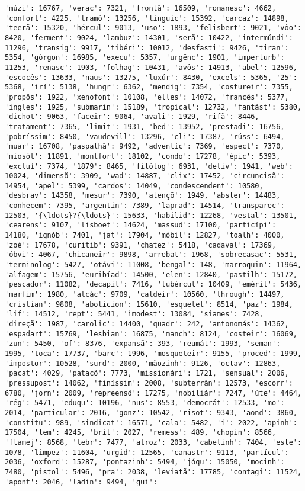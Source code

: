 \documentclass[11pt]{article}
\begin{document}
\begin{Verbatim}[commandchars=\\\{\}]
'múzi': 16767, 'verac': 7321, 'frontã': 16509, 'romanesc': 4662, 'confort': 4225, 'tramó': 13256, 'linguic': 15392, 'carcaz': 14898, 'teerã': 15320, 'hércul': 9013, 'uso': 1893, 'felisbert': 9021, 'vôo': 8420, 'ferment': 9024, 'lambuz': 14301, 'serã': 10422, 'intermúndi': 11296, 'transig': 9917, 'tibéri': 10012, 'desfasti': 9426, 'tiran': 5354, 'górgon': 16985, 'execu': 5357, 'urgênc': 1901, 'imperturb': 11253, 'renasc': 1903, 'folhag': 10431, 'avôs': 14913, 'abel': 12596, 'escocês': 13633, 'naus': 13275, 'luxúr': 8430, 'excels': 5365, '25': 5368, 'irí': 5138, 'hungr': 6362, 'mendig': 7354, 'costureir': 7355, 'propôs': 1922, 'xenofont': 10108, 'elles': 14072, 'francês': 5377, 'ingles': 1925, 'submarin': 15189, 'tropical': 12732, 'fantást': 5380, 'dichot': 9063, 'faceir': 9064, 'avali': 1929, 'rifã': 8446, 'tratament': 7365, 'limit': 1931, 'bed': 13952, 'prestadi': 16756, 'pobríssim': 8450, 'vaudevill': 13296, 'cli': 17387, 'rúss': 6494, 'muar': 16708, 'paspalhã': 9492, 'adventíc': 7369, 'espect': 7370, 'miosót': 11891, 'montfort': 18102, 'condo': 17278, 'épic': 5393, 'excluí': 7374, '1879': 8465, 'filólog': 6931, 'detiv': 1941, 'web': 10024, 'dimensõ': 3909, 'wad': 14887, 'clix': 17452, 'circuncisã': 14954, 'apel': 5399, 'cardos': 14049, 'condescendent': 10580, 'desbrav': 14358, 'mesur': 7390, 'atençõ': 1949, 'abster': 14483, 'conhecem': 7395, 'argentin': 7389, 'laprad': 14514, 'transparec': 12503, '{\ldots}?{\ldots}': 15633, 'habilid': 12268, 'vestal': 13501, 'cearens': 9107, 'lisboet': 14624, 'massud': 17100, 'particípi': 14180, 'ignób': 7401, 'jat': 17904, 'móbil': 12827, 'toalh': 4000, 'zoé': 17678, 'curitib': 9391, 'chatez': 5418, 'cadaval': 17369, 'óbvi': 4067, 'chicaneir': 9898, 'arrebat': 1968, 'sobrecasac': 5531, 'terminolog': 5427, 'otávi': 11008, 'bengal': 148, 'marroquin': 11964, 'alfagem': 15756, 'euribíad': 14500, 'elen': 12840, 'pastilh': 15172, 'pescador': 11082, 'decapit': 7416, 'tubércul': 10409, 'emérit': 5436, 'marfim': 1980, 'alcác': 9709, 'caldeir': 10560, 'through': 14497, 'cristian': 9808, 'abolicion': 15610, 'esquelet': 8514, 'paz': 1984, 'lif': 14512, 'rept': 5441, 'imodest': 13084, 'siames': 7428, 'direçã': 1987, 'carolic': 14400, 'quadr': 242, 'antonomás': 14362, 'espadart': 15769, 'lesbian': 16875, 'manch': 8124, 'costeir': 16069, 'zun': 5450, 'of': 8376, 'expansã': 393, 'reumát': 1993, 'seman': 1995, 'toca': 17737, 'barc': 1996, 'mosqueteir': 9155, 'proced': 1999, 'impostor': 10528, 'surd': 2000, 'mãozinh': 9126, 'octav': 12863, 'pacat': 4029, 'patacõ': 7773, 'missionári': 1721, 'sensual': 2006, 'pressupost': 14062, 'finíssim': 2008, 'subterrân': 12573, 'escorr': 6780, 'jorn': 2009, 'repreensõ': 17275, 'nobiliár': 7247, 'úte': 4464, 'rég': 5471, 'eduqu': 10196, 'nus': 8553, 'democrát': 12533, 'mo': 2014, 'particular': 2016, 'gonz': 10542, 'risot': 9343, 'aond': 3860, 'constitu': 989, 'sindicat': 16571, 'cala': 5482, 'i': 2022, 'apinh': 17504, 'lem': 4245, 'brit': 2027, 'remess': 489, 'chopin': 8566, 'flamej': 8568, 'lebr': 7477, 'atroz': 2033, 'cabelinh': 7404, 'este': 1078, 'limpez': 11604, 'urgid': 12565, 'canastr': 9113, 'partícul': 2036, 'oxford': 15287, 'pontazinh': 5494, 'jóqu': 15050, 'mocinh': 7480, 'pistol': 5496, 'pra': 2038, 'leviatã': 17785, 'contagi': 11524, 'apont': 2046, 'ladin': 9494, 'gui': 
\end{Verbatim}
\end{document}
